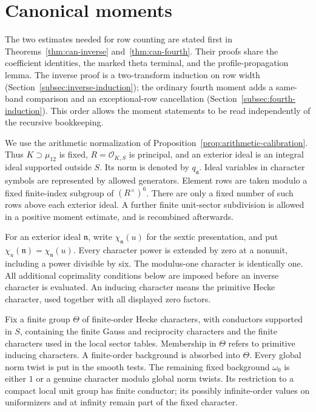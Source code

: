 \documentclass[11pt,a4paper]{article}
\numberwithin{equation}{section}
\theoremstyle{definition}
\theoremstyle{remark}
\begin{document}
\section{Canonical moments}\label{sec:canonical}

The two estimates needed for row counting are stated first in
Theorems~\ref{thm:can-inverse} and~\ref{thm:can-fourth}.
Their proofs share the coefficient identities, the marked theta
terminal, and the profile-propagation lemma. The inverse proof is a
two-transform induction on row width
(Section~\ref{subsec:inverse-induction}); the ordinary fourth moment
adds a same-band comparison and an exceptional-row cancellation
(Section~\ref{subsec:fourth-induction}). This order allows the moment
statements to be read independently of the recursive bookkeeping.


We use the arithmetic normalization of
Proposition~\ref{prop:arithmetic-calibration}.  Thus $K\supset\mu_{12}$
is fixed, $R=\mathcal O_{K,S}$ is principal, and an exterior ideal is an
integral ideal supported outside $S$.  Its norm is denoted by $q_{\mathfrak a}$.
Ideal variables in character symbols are represented by allowed generators.
Element rows are taken modulo a fixed finite-index subgroup of
$(R^\times)^6$.  There are only a fixed number of such rows above each
exterior ideal.  A further finite unit-sector subdivision is allowed in a
positive moment estimate, and is recombined afterwards.

For an exterior ideal $\mathfrak n$, write
$\chi_{\mathfrak n}(u)$ for the sextic presentation, and put
$\chi_u(\mathfrak n)=\chi_{\mathfrak n}(u)$.
Every character power is extended by zero at a nonunit, including a power
divisible by six.  The modulus-one character is identically one.
All additional coprimality conditions below are imposed before an inverse
character is evaluated.  An inducing character means the primitive Hecke character, used
together with all displayed zero factors.

Fix a finite group $\Theta$ of finite-order Hecke characters, with
conductors supported in $S$, containing the finite Gauss and reciprocity
characters and the finite characters used in the local sector tables.
Membership in $\Theta$ refers to primitive inducing characters.
A finite-order background is absorbed into $\Theta$.
Every global norm twist is put in the smooth tests.  The remaining fixed
background $\omega_0$ is either $1$ or a genuine character modulo global
norm twists.  Its restriction to a compact local unit group has finite
conductor; its possibly infinite-order values on uniformizers and at
infinity remain part of the fixed character.
\end{document}
